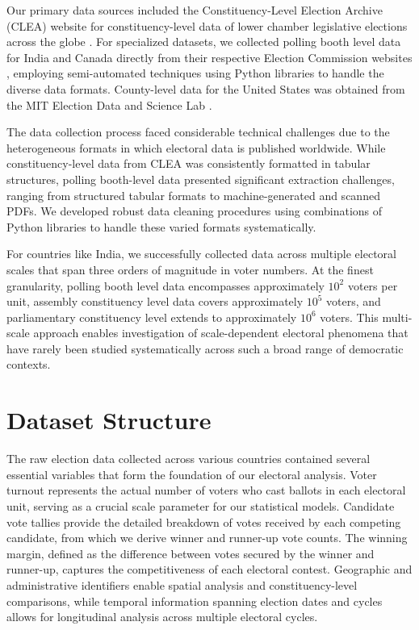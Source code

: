 Our primary data sources included the Constituency-Level Election Archive (CLEA) website for constituency-level data of lower chamber legislative elections across the globe \cite{clea}. For specialized datasets, we collected polling booth level data for India and Canada directly from their respective Election Commission websites \cite{india_data, canada_data}, employing semi-automated techniques using Python libraries to handle the diverse data formats. County-level data for the United States was obtained from the MIT Election Data and Science Lab \cite{DVN/VOQCHQ_2018}.

The data collection process faced considerable technical challenges due to the heterogeneous formats in which electoral data is published worldwide. While constituency-level data from CLEA was consistently formatted in tabular structures, polling booth-level data presented significant extraction challenges, ranging from structured tabular formats to machine-generated and scanned PDFs. We developed robust data cleaning procedures using combinations of Python libraries to handle these varied formats systematically.

For countries like India, we successfully collected data across multiple electoral scales that span three orders of magnitude in voter numbers. At the finest granularity, polling booth level data encompasses approximately $10^2$ voters per unit, assembly constituency level data covers approximately $10^5$ voters, and parliamentary constituency level extends to approximately $10^6$ voters. This multi-scale approach enables investigation of scale-dependent electoral phenomena that have rarely been studied systematically across such a broad range of democratic contexts.

\section{Dataset Structure}

The raw election data collected across various countries contained several essential variables that form the foundation of our electoral analysis. Voter turnout represents the actual number of voters who cast ballots in each electoral unit, serving as a crucial scale parameter for our statistical models. Candidate vote tallies provide the detailed breakdown of votes received by each competing candidate, from which we derive winner and runner-up vote counts. The winning margin, defined as the difference between votes secured by the winner and runner-up, captures the competitiveness of each electoral contest. Geographic and administrative identifiers enable spatial analysis and constituency-level comparisons, while temporal information spanning election dates and cycles allows for longitudinal analysis across multiple electoral cycles.

